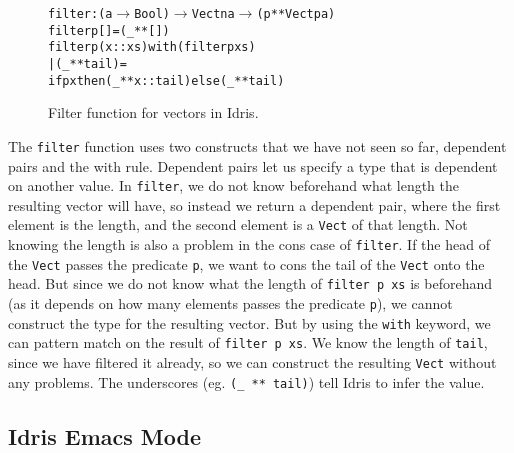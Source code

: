 \begin{figure}
\begin{alltt}
filter : (a \(\to\) Bool) \(\to\) Vect n a \(\to\) (p ** Vect p a)
filter p [] = (_ ** [])
filter p (x::xs) with (filter p xs)
  | (_ ** tail) =
    if p x then (_ ** x::tail) else (_ ** tail)
\end{alltt}
\caption{Filter function for vectors in Idris.}
\label{fig:filter}
\end{figure}

The \texttt{filter} function uses two constructs that we have not seen so far, dependent pairs and the with rule. Dependent pairs let us specify a type that is dependent on another value. In \texttt{filter}, we do not know beforehand what length the resulting vector will have, so instead we return a dependent pair, where the first element is the length, and the second element is a \texttt{Vect} of that length. Not knowing the length is also a problem in the cons case of \texttt{filter}. If the head of the \texttt{Vect} passes the predicate \texttt{p}, we want to cons the tail of the \texttt{Vect} onto the head. But since we do not know what the length of \texttt{filter p xs} is beforehand (as it depends on how many elements passes the predicate \texttt{p}), we cannot construct the type for the resulting vector. But by using the \texttt{with} keyword, we can pattern match on the result of \texttt{filter p xs}. We know the length of \texttt{tail}, since we have filtered it already, so we can construct the resulting \texttt{Vect} without any problems. The underscores (eg. \texttt{(\_ ** tail)}) tell Idris to infer the value.



\subsection{Idris Emacs Mode}
